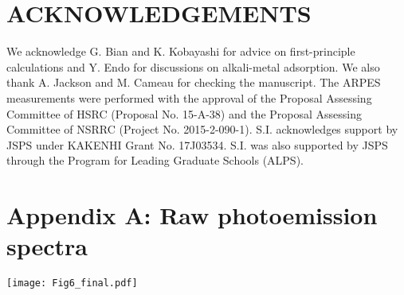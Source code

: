 \documentclass[reprint,secnumarabic,amssymb, nobibnotes, aps, prl,superscriptaddress,showpacs]{revtex4-1}
\def\gb{$\bar{\Gamma}$\ }
\def\gmb{${\bar{\Gamma}}{\bar{\mathrm{M}}}$\ }
\def\gkb{${\bar{\Gamma}}{\bar{\mathrm{K}}}$\ }
\begin{document}
\section{ACKNOWLEDGEMENTS}
We acknowledge G. Bian and K. Kobayashi for advice on first-principle calculations and Y. Endo for discussions on alkali-metal adsorption. We also thank A. Jackson and M. Cameau for checking the manuscript. The ARPES measurements were performed with the approval of the Proposal Assessing Committee of HSRC (Proposal No. 15-A-38) and the Proposal Assessing Committee of NSRRC (Project No. 2015-2-090-1). S.I. acknowledges support by JSPS under KAKENHI Grant No. 17J03534. S.I. was also supported by JSPS through the Program for Leading Graduate Schools (ALPS).

\section{Appendix A: Raw photoemission spectra}

\begin{figure*}
\texttt{[image: Fig6\_final.pdf]}
\caption{\label{fig6}(a)-(c) Energy distribution curves and (d)-(f) momentum distribution curves extracted from the ARPES images used in Fig. \ref{fig2}. The curves were manually scaled and offset for the clear visualization. The wave number and energy values are summarized in the right axes. Peak positions determined by Lorentzian fitting are shown with markers. The dashed lines describe the Fermi level and the thick solid lines indicate EDCs at high-symmetry points (\gb and $\bar{\mathrm{M}}$). The black arrows highlight specific peaks discussed in the main text. (g), (h) Same as (a)-(c) but for a wider energy range to show QWS peak positions used in Fig. \ref{fig4}(a) along \gmb direction. (i), (j) Same as (g) and (h) but for QWSs along \gkb direction. The insets magnify some small peaks with (i) linear and (j) logarithmic scales.}	
\end{figure*}
\end{document}
